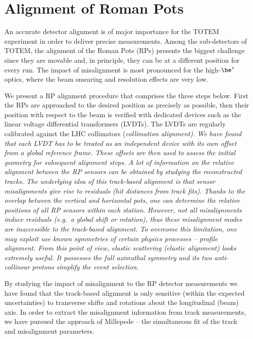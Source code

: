 \chapter[al]{Alignment of Roman Pots}

An accurate detector alignment is of major importance for the TOTEM experiment in order to deliver precise measurements. Among the sub-detectors of TOTEM, the alignment of the Roman Pots (RPs) presents the biggest challenge since they are movable and, in principle, they can be at a different position for every run. The impact of misalignment is most pronounced for the high-$\be^*$ optics, where the beam smearing and resolution effects are very low.

We present a RP alignment procedure that comprises the three steps below.
\bitm
\itm First the RPs are approached to the desired position as precisely as possible, then their position with respect to the beam is verified with dedicated devices such as the linear voltage differential transformers (LVDTs). The LVDTs are regularly calibrated against the LHC collimators (\em{collimation alignment}). We have found that each LVDT has to be treated as an independent device with its own offset from a global reference frame. These offsets are then used to assess the initial geometry for subsequent alignment steps.
%
\itm A lot of information on the relative alignment between the RP sensors can be obtained by studying the reconstructed tracks. The underlying idea of this \em{track-based alignment} is that sensor misalignments give rise to residuals (hit distances from track fits). Thanks to the overlap between the vertical and horizontal pots, one can determine the relative positions of all RP sensors within each station.
%
\itm However, not all misalignments induce residuals (e.g.~a global shift or rotation), thus these misalignment modes are inaccessible to the track-based alignment. To overcome this limitation, one may exploit use known symmetries of certain physics processes -- \em{profile alignment}. From this point of view, elastic scattering (\em{elastic alignment}) looks extremely useful. It possesses the full azimuthal symmetry and its two anti-collinear protons simplify the event selection.
\eitm

\vskip1mm
By studying the impact of misalignment to the RP detector measurements we have found that the track-based alignment is only sensitive (within the expected uncertainties) to transverse shifts and rotations about the longitudinal (beam) axis. In order to extract the misalignment information from track measurements, we have pursued the approach of Millepede  -- the simultaneous fit of the track and misalignment parameters.

